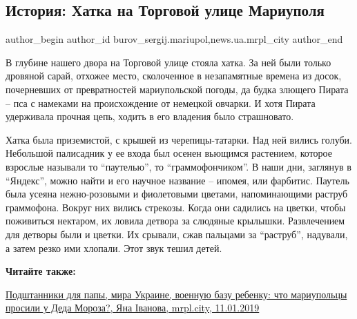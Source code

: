  
 
 
 
 
 
\subsection{История: Хатка на Торговой улице Мариуполя}
\label{sec:12_01_2019.stz.news.ua.mrpl_city.1.istoria_hatka_na_torgovoj_ulice_mariupolja}
 
\ifcmt
 author_begin
   author_id burov_sergij.mariupol,news.ua.mrpl_city
 author_end
\fi


В глубине нашего двора на Торговой улице стояла хатка. За ней были только
дровяной сарай, отхожее место, сколоченное в незапамятные времена из досок,
почерневших от превратностей мариупольской погоды, да будка злющего Пирата –
пса с намеками на происхождение от немецкой овчарки. И хотя Пирата удерживала
прочная цепь, ходить в его владения было страшновато.

Хатка была приземистой, с крышей из черепицы-татарки. Над ней вились голуби.
Небольшой палисадник у ее входа был осенен вьющимся растением, которое взрослые
называли то \enquote{паутелью}, то \enquote{граммофончиком}. В наши дни, заглянув в \enquote{Яндекс},
можно найти и его научное название – ипомея, или фарбитис. Паутель была усеяна
нежно-розовыми и фиолетовыми цветами, напоминающими раструб граммофона. Вокруг
них вились стрекозы. Когда они садились на цветки, чтобы поживиться нектаром,
их ловила детвора за слюдяные крылышки. Развлечением для детворы были и цветки.
Их срывали, сжав пальцами за \enquote{раструб}, надували, а затем резко ими хлопали.
Этот звук тешил детей.

\textbf{Читайте также:} 

\href{https://mrpl.city/news/view/podshtanniki-dlya-papy-mira-ukraine-voennuyu-bazu-rebenku-chto-mariupoltsy-prosili-u-deda-moroza-foto}{%
Подштанники для папы, мира Украине, военную базу ребенку: что мариупольцы просили у Деда Мороза?, Яна Іванова, mrpl.city, 11.01.2019}

